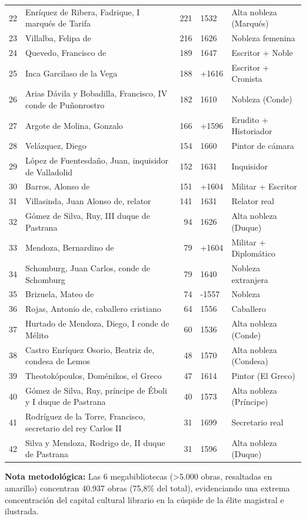 \documentclass[12pt,a4paper]{article}
\begin{document}
\begin{longtable}{rlrll}
22 & Enríquez de Ribera, Fadrique, I marqués de Tarifa & 221 & 1532 & Alta nobleza (Marqués) \\
23 & Villalba, Felipa de & 216 & 1626 & Nobleza femenina \\
24 & Quevedo, Francisco de & 189 & 1647 & Escritor + Noble \\
25 & Inca Garcilaso de la Vega & 188 & +1616 & Escritor + Cronista \\
26 & Arias Dávila y Bobadilla, Francisco, IV conde de Puñonrostro & 182 & 1610 & Nobleza (Conde) \\
27 & Argote de Molina, Gonzalo & 166 & +1596 & Erudito + Historiador \\
28 & Velázquez, Diego & 154 & 1660 & Pintor de cámara \\
29 & López de Fuentesdaño, Juan, inquisidor de Valladolid & 152 & 1631 & Inquisidor \\
30 & Barros, Alonso de & 151 & +1604 & Militar + Escritor \\
31 & Villasinda, Juan Alonso de, relator & 141 & 1631 & Relator real \\
32 & Gómez de Silva, Ruy, III duque de Pastrana & 94 & 1626 & Alta nobleza (Duque) \\
33 & Mendoza, Bernardino de & 79 & +1604 & Militar + Diplomático \\
34 & Schomburg, Juan Carlos, conde de Schomburg & 79 & 1640 & Nobleza extranjera \\
35 & Brizuela, Mateo de & 74 & -1557 & Nobleza \\
36 & Rojas, Antonio de, caballero cristiano & 64 & 1556 & Caballero \\
37 & Hurtado de Mendoza, Diego, I conde de Mélito & 60 & 1536 & Alta nobleza (Conde) \\
38 & Castro Enríquez Osorio, Beatriz de, condesa de Lemos & 48 & 1570 & Alta nobleza (Condesa) \\
39 & Theotokópoulos, Doménikos, el Greco & 47 & 1614 & Pintor (El Greco) \\
40 & Gómez de Silva, Ruy, príncipe de Éboli y I duque de Pastrana & 40 & 1573 & Alta nobleza (Príncipe) \\
41 & Rodríguez de la Torre, Francisco, secretario del rey Carlos II & 31 & 1699 & Secretario real \\
42 & Silva y Mendoza, Rodrigo de, II duque de Pastrana & 31 & 1596 & Alta nobleza (Duque) \\
\end{longtable}

\textbf{Nota metodológica:} Las 6 megabibliotecas (>5.000 obras, resaltadas en amarillo) concentran 40.937 obras (75,8\% del total), evidenciando una extrema concentración del capital cultural librario en la cúspide de la élite magistral e ilustrada.
\end{document}
